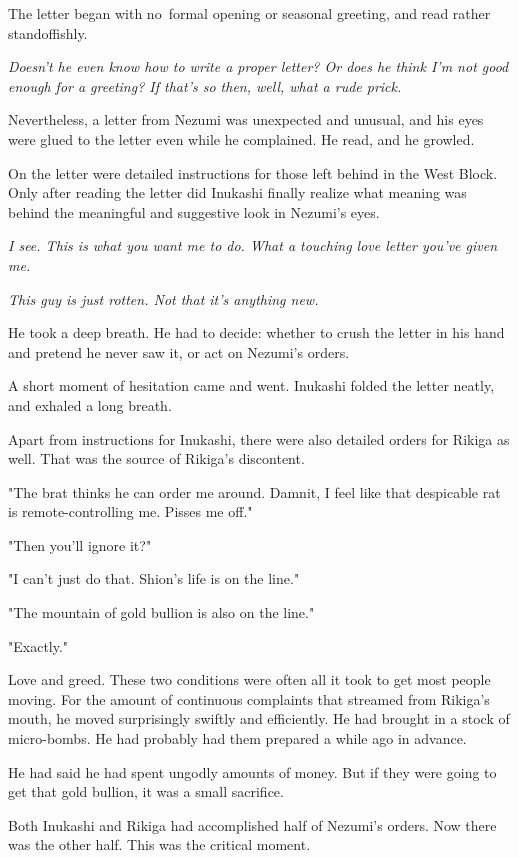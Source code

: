 The letter began with no~formal opening or seasonal greeting, and read
rather standoffishly.

\emph{Doesn't he even know how to write a proper letter? Or does he think I'm
not good enough for a greeting? If that's so then, well, what a rude
prick.}

Nevertheless, a letter from Nezumi was unexpected and unusual, and his
eyes were glued to the letter even while he complained. He read, and he
growled.

On the letter were detailed instructions for those left behind in the
West Block. Only after reading the letter did Inukashi finally realize
what meaning was behind the meaningful and suggestive look in Nezumi's
eyes.

\emph{I see. This is what you want me to do. What a touching love letter
you've given me.}

\emph{This guy is just rotten. Not that it's anything new.}

He took a deep breath. He had to decide: whether to crush the letter in
his hand and pretend he never saw it, or act on Nezumi's orders.

A short moment of hesitation came and went. Inukashi folded the letter
neatly, and exhaled a long breath.

Apart from instructions for Inukashi, there were also detailed orders
for Rikiga as well. That was the source of Rikiga's discontent.

"The brat thinks he can order me around. Damnit, I feel like that
despicable rat is remote-controlling me. Pisses me off."

"Then you'll ignore it?"

"I can't just do that. Shion's life is on the line."

"The mountain of gold bullion is also on the line."

"Exactly."

Love and greed. These two conditions were often all it took to get most
people moving. For the amount of continuous complaints that streamed
from Rikiga's mouth, he moved surprisingly swiftly and efficiently. He
had brought in a stock of micro-bombs. He had probably had them prepared
a while ago in advance.

He had said he had spent ungodly amounts of money. But if they were
going to get that gold bullion, it was a small sacrifice.

Both Inukashi and Rikiga had accomplished half of Nezumi's orders. Now
there was the other half. This was the critical moment.


